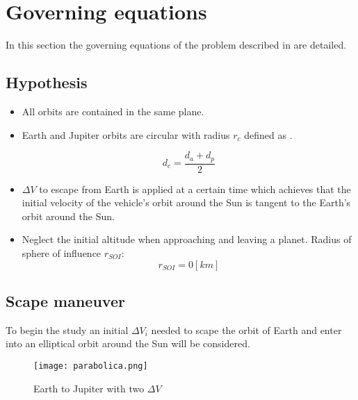 \section{Governing equations}\label{sec:governing_equations}

In this section the governing equations of the problem described in  are detailed.

\subsection{Hypothesis}

\begin{itemize}
\item All orbits are contained in the same plane.
\item Earth and Jupiter orbits are circular with radius $r_c$ defined as .

\begin{equation}\label{eq:radi_mig}
d_c = \frac{d_a + d_p}{2}
\end{equation}

\item $\Delta V$ to escape from Earth is applied at a certain time which achieves that the initial velocity of the vehicle's orbit around the Sun is tangent to the Earth's orbit around the Sun.

\item Neglect the initial altitude when approaching and leaving a planet. Radius of sphere of influence $r_{SOI}$: $$r_{SOI} = 0 \si{[km]}$$
\end{itemize}

\subsection{Scape maneuver} \label{sec:scape_maneuver}

To begin the study an initial $\Delta V_{i}$ needed to scape the orbit of Earth and enter into an elliptical orbit around the Sun will be considered.

\begin{figure}[H]
	\centering
		\texttt{[image: parabolica.png]}
	\caption{Earth to Jupiter with two $\Delta V$}
	\label{fig:parabolica}
\end{figure}

